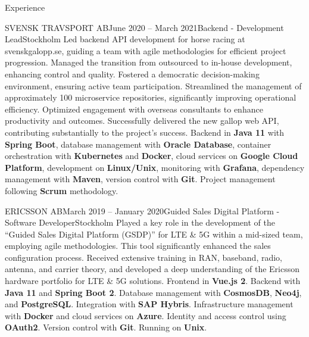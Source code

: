 \documentclass{resume}
\begin{document}
\begin{rSection}{Experience}
    \begin{rSubsection}{SVENSK TRAVSPORT AB}{June 2020 -- March 2021}{Backend - Development Lead}{Stockholm}
      \bItem Led backend API development for horse racing at svenskgalopp.se, guiding a team with agile methodologies for efficient project progression. Managed the transition from outsourced to in-house development, enhancing control and quality. Fostered a democratic decision-making environment, ensuring active team participation.
      \bItem Streamlined the management of approximately 100 microservice repositories, significantly improving operational efficiency. Optimized engagement with overseas consultants to enhance productivity and outcomes. Successfully delivered the new gallop web API, contributing substantially to the project’s success.
      \techItem Backend in \textbf{Java 11} with \textbf{Spring Boot}, database management with \textbf{Oracle Database}, container orchestration with \textbf{Kubernetes} and \textbf{Docker}, cloud services on \textbf{Google Cloud Platform}, development on \textbf{Linux/Unix}, monitoring with \textbf{Grafana}, dependency management with \textbf{Maven}, version control with \textbf{Git}. Project management following \textbf{Scrum} methodology.
    \end{rSubsection}

    \begin{rSubsection}{ERICSSON AB}{March 2019 -- January 2020}{Guided Sales Digital Platform - Software Developer}{Stockholm}
      \bItem Played a key role in the development of the ``Guided Sales Digital Platform (GSDP)'' for LTE \& 5G within a mid-sized team, employing agile methodologies.
      \bItem This tool significantly enhanced the sales configuration process.
      \bItem Received extensive training in RAN, baseband, radio, antenna, and carrier theory, and developed a deep understanding of the Ericsson hardware portfolio for LTE \& 5G solutions.
      \techItem Frontend in \textbf{Vue.js 2}. Backend with \textbf{Java 11} and \textbf{Spring Boot 2}. Database management with \textbf{CosmosDB}, \textbf{Neo4j}, and \textbf{PostgreSQL}. Integration with \textbf{SAP Hybris}. Infrastructure management with \textbf{Docker} and cloud services on \textbf{Azure}. Identity and access control using \textbf{OAuth2}. Version control with \textbf{Git}. Running on \textbf{Unix}.
    \end{rSubsection}

    \pagebreak


\end{rSection}
\end{document}
